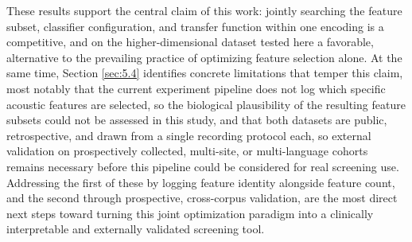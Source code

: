 These results support the central claim of this work: jointly searching the feature subset, classifier configuration, and transfer function within one encoding is a competitive, and on the higher-dimensional dataset tested here a favorable, alternative to the prevailing practice of optimizing feature selection alone. At the same time, Section \ref{sec:5.4} identifies concrete limitations that temper this claim, most notably that the current experiment pipeline does not log which specific acoustic features are selected, so the biological plausibility of the resulting feature subsets could not be assessed in this study, and that both datasets are public, retrospective, and drawn from a single recording protocol each, so external validation on prospectively collected, multi-site, or multi-language cohorts remains necessary before this pipeline could be considered for real screening use. Addressing the first of these by logging feature identity alongside feature count, and the second through prospective, cross-corpus validation, are the most direct next steps toward turning this joint optimization paradigm into a clinically interpretable and externally validated screening tool.
